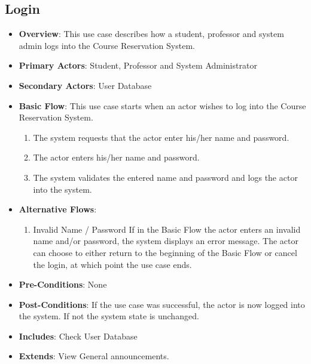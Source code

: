 \documentclass[12pt, a4]{article}
\begin{document}
\subsection{Login}
\begin{itemize}
    \item \textbf{Overview}: This use case describes how a student, professor and system admin logs into the Course Reservation System.
    \item \textbf{Primary Actors}: Student, Professor and System Administrator
    \item \textbf{Secondary Actors}: User Database
    \item \textbf{Basic Flow}: This use case starts when an actor wishes to log into the Course Reservation System.
        \begin{enumerate}
            \item The system requests that the actor enter his/her name and password.
            \item The actor enters his/her name and password.
            \item The system validates the entered name and password and logs the actor into the system.
        \end{enumerate}
    \item \textbf{Alternative Flows}:
        \begin{enumerate}
            \item Invalid Name / Password \newline
            If in the Basic Flow the actor enters an invalid name and/or password, the system displays an error message. The actor can choose to either return to the beginning of the Basic Flow or cancel the login, at which point the use case ends.
        \end{enumerate}
    \item \textbf{Pre-Conditions}: None
    \item \textbf{Post-Conditions}: If the use case was successful, the actor is now logged into the system. If not the system state is unchanged.
    \item \textbf{Includes}: Check User Database
    \item \textbf{Extends}: View General announcements.
\end{itemize}

\end{document}
